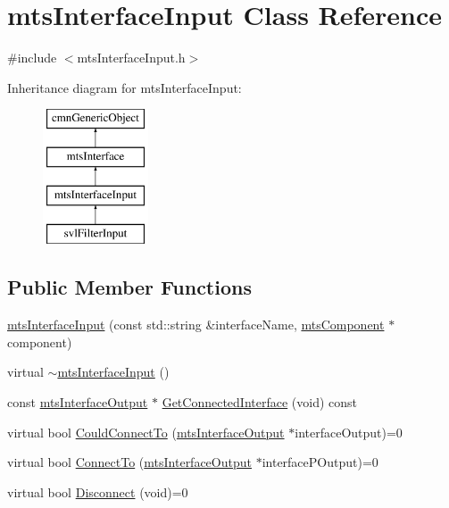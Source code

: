 \hypertarget{classmts_interface_input}{\section{mts\-Interface\-Input Class Reference}
\label{classmts_interface_input}
}


{\ttfamily \#include $<$mts\-Interface\-Input.\-h$>$}

Inheritance diagram for mts\-Interface\-Input\-:\begin{figure}[H]
\begin{center}
\leavevmode
\includegraphics[height=4.000000cm]{d0/d17/classmts_interface_input}
\end{center}
\end{figure}
\subsection*{Public Member Functions}
\begin{DoxyCompactItemize}
\item 
\hyperlink{classmts_interface_input_a898d12de2aa9781e5a97d2d379bfd902}{mts\-Interface\-Input} (const std\-::string \&interface\-Name, \hyperlink{classmts_component}{mts\-Component} $\ast$component)
\item 
virtual \hyperlink{classmts_interface_input_a15ccb20eb9a6c17d4b124b178fa891f7}{$\sim$mts\-Interface\-Input} ()
\item 
const \hyperlink{classmts_interface_output}{mts\-Interface\-Output} $\ast$ \hyperlink{classmts_interface_input_a6c6a10b98df1193d52bba32c966d2a97}{Get\-Connected\-Interface} (void) const 
\item 
virtual bool \hyperlink{classmts_interface_input_a4cb4736ed2bdf9f54bc10a459bfbacd7}{Could\-Connect\-To} (\hyperlink{classmts_interface_output}{mts\-Interface\-Output} $\ast$interface\-Output)=0
\item 
virtual bool \hyperlink{classmts_interface_input_ad1b9041d37b0d78b11183e37cefe2a7f}{Connect\-To} (\hyperlink{classmts_interface_output}{mts\-Interface\-Output} $\ast$interface\-P\-Output)=0
\item 
virtual bool \hyperlink{classmts_interface_input_abc4be5ee83eca5ced2ad6e892fa19572}{Disconnect} (void)=0
\end{DoxyCompactItemize}
